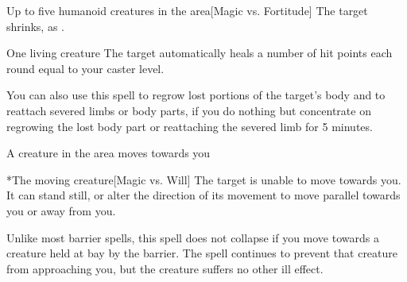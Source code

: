\begin{spellheader}
    \spelldur{\durshort \dismissable}
\end{spellheader}
\begin{spelleffects}
    \begin{spelltargets}{Up to five humanoid creatures in the area}[Magic vs. Fortitude]
        \spellsuccess The target shrinks, as .
    \end{spelltargets}
\end{spelleffects}

\begin{spellheader}
    \spelldur{\durshort}
\end{spellheader}
\begin{spelleffects}
    \begin{spelltarget}{One living creature}
        \spelleffect The target automatically heals a number of hit points each round equal to your caster level.
        \par You can also use this spell to regrow lost portions of the target's body and to reattach severed limbs or body parts, if you do nothing but concentrate on regrowing the lost body part or reattaching the severed limb for 5 minutes.
    \end{spelltarget}
\end{spelleffects}

\begin{spellheader}
    \spelldur{\durshort \dismissable}
\end{spellheader}
\begin{spelleffects}
    \begin{spelltrigger}{A creature in the area moves towards you}
        \begin{spelltarget}*{The moving creature}[Magic vs. Will]
            \spellsuccess The target is unable to move towards you. It can stand still, or alter the direction of its movement to move parallel towards you or away from you.
        \end{spelltarget}
    \end{spelltrigger}
\end{spelleffects}
\begin{spellfooter}
    \spellnotes Unlike most barrier spells, this spell does not collapse if you move towards a creature held at bay by the barrier. The spell continues to prevent that creature from approaching you, but the creature suffers no other ill effect.
\end{spellfooter}

